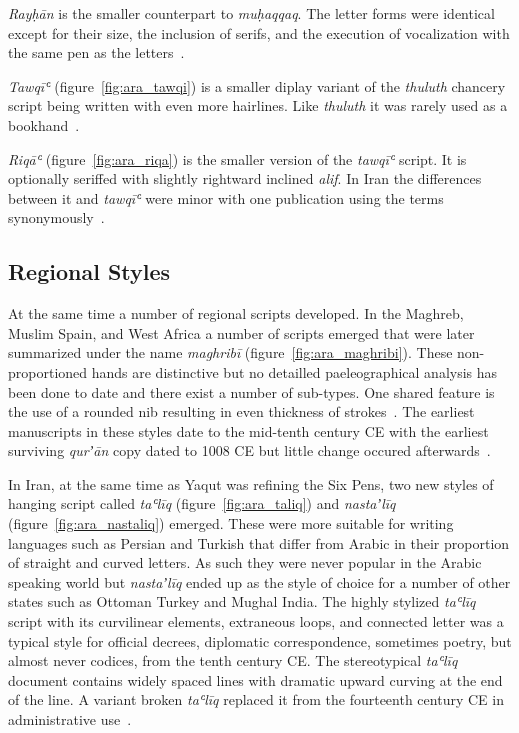 \emph{Rayḥān} is the smaller counterpart to \emph{muḥaqqaq}. The letter forms
were identical except for their size, the inclusion of serifs, and the
execution of vocalization with the same pen as the letters~\cite[pg.
308]{EncyclopediaofArabicLanguageandLinguisticsVolume3}.

\emph{Tawqīʿ} (figure~\ref{fig:ara_tawqi}) is a smaller diplay variant of the
\emph{thuluth} chancery script being written with even more hairlines. Like
\emph{thuluth} it was rarely used as a bookhand~\cite[pg.
264-264]{gacek2009arabic}.

\emph{Riqāʿ} (figure~\ref{fig:ara_riqa}) is the smaller version of the
\emph{tawqīʿ} script. It is optionally seriffed with slightly rightward
inclined \emph{alif}. In Iran the differences between it and \emph{tawqīʿ} were
minor with one publication using the terms synonymously~\cite[pg.
224]{gacek2009arabic}.

\subsection{Regional Styles}

At the same time a number of regional scripts developed. In the Maghreb, Muslim
Spain, and West Africa a number of scripts emerged that were later summarized
under the name \emph{maghribī} (figure~\ref{fig:ara_maghribi}). These
non-proportioned  hands are distinctive but no detailled paeleographical
analysis has been done to date and there exist a number of sub-types. One
shared feature is the use of a rounded nib resulting in even thickness of
strokes~\cite[pg. 147-148]{gacek2009arabic}.  The earliest manuscripts in these
styles date to the mid-tenth century CE with the earliest surviving
\emph{qurʼān} copy dated to 1008 CE but little change occured
afterwards~\cite[pg. 566]{blair2006islamic}.

In Iran, at the same time as Yaqut was refining the Six Pens, two new styles of
hanging script called \emph{taʿlīq} (figure~\ref{fig:ara_taliq}) and
\emph{nastaʼlīq} (figure~\ref{fig:ara_nastaliq}) emerged. These were more
suitable for writing languages such as Persian and Turkish that differ from
Arabic in their proportion of straight and curved letters. As such they were
never popular in the Arabic speaking world but \emph{nastaʼlīq} ended up as the
style of choice for a number of other states such as Ottoman Turkey and Mughal
India. The highly stylized \emph{taʿlīq} script with its curvilinear elements,
extraneous loops, and connected letter was a typical style for official
decrees, diplomatic correspondence, sometimes poetry, but almost never codices,
from the tenth century CE. The stereotypical \emph{taʿlīq} document contains
widely spaced lines with dramatic upward curving at the end of the line. A
variant broken \emph{taʿlīq} replaced it from the fourteenth century CE in
administrative use~\cite[pg. 270-273]{blair2006islamic}.


